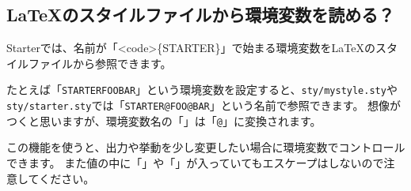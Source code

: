 \begin{starterterminal}\end{starterterminal}

\subsection{\LaTeX{}のスタイルファイルから環境変数を読める？}
\label{sec:2-7-3}

Starterでは、名前が「\textdollar{}\textless{}code\textgreater{}\{STARTER\textunderscore{}\}」で始まる環境変数を\LaTeX{}のスタイルファイルから参照できます。

たとえば「\texttt{STARTER\textunderscore{}FOO\textunderscore{}BAR}」という環境変数を設定すると、\texttt{sty/mystyle.sty}や\texttt{sty/starter.sty}では「\texttt{\reviewbackslash{}STARTER@FOO@BAR}」という名前で参照できます。
想像がつくと思いますが、環境変数名の「\texttt{\textunderscore{}}」は「\texttt{@}」に変換されます。

\label{}
\begin{starterterminal}\end{starterterminal}
\label{}
\begin{starterprogram}\end{starterprogram}

この機能を使うと、出力や挙動を少し変更したい場合に環境変数でコントロールできます。
また値の中に「\texttt{\textdollar{}}」や「\texttt{\reviewbackslash{}}」が入っていてもエスケープはしないので注意してください。
